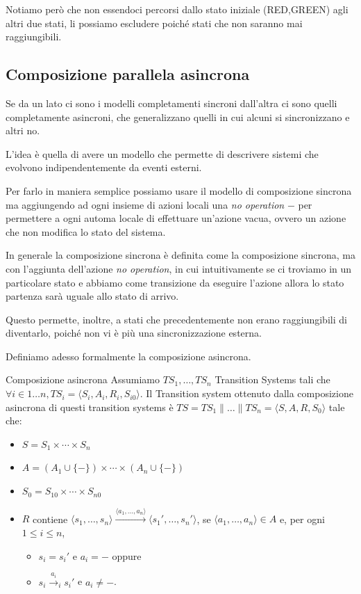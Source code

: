 \begin{note}{}
  Notiamo però che non essendoci percorsi dallo stato iniziale (RED,GREEN) agli altri due stati, li possiamo escludere poiché stati che non saranno mai raggiungibili.
\end{note}

\subsection{Composizione parallela asincrona}

Se da un lato ci sono i modelli completamenti sincroni dall'altra ci sono quelli completamente asincroni, che generalizzano quelli in cui alcuni si sincronizzano e altri no.

L'idea è quella di avere un modello che permette di descrivere sistemi che evolvono indipendentemente da eventi esterni.

Per farlo in maniera semplice possiamo usare il modello di composizione sincrona ma aggiungendo ad ogni insieme di azioni locali una \textit{no operation} \(-\) per permettere a ogni automa locale di effettuare un'azione vacua, ovvero un azione che non modifica lo stato del sistema.


In generale la composizione sincrona è definita come la composizione sincrona, ma con l'aggiunta dell'azione \textit{no operation}, in cui intuitivamente se ci troviamo in un particolare stato e abbiamo come  transizione da eseguire l'azione \q{\(-\)} allora lo stato partenza sarà uguale allo stato di arrivo.

Questo permette, inoltre, a stati che precedentemente non erano raggiungibili di diventarlo, poiché non vi è più una sincronizzazione esterna.

Definiamo adesso formalmente la composizione asincrona.

\begin{definition}{Composizione asincrona}
  Assumiamo \(TS_1,\ldots,TS_n\) Transition Systems tali che \(\forall i \in 1\ldots n, TS_i = \langle S_i,A_i,R_i,S_{i0}\rangle \). Il Transition system ottenuto dalla composizione asincrona di questi transition systems è \( TS = TS_1 \| \ldots \| TS_n = \langle S,A,R,S_0\rangle \) tale che:
  \begin{itemize}
    \item \( S = S_1 \times \cdots \times S_n \)
    \item \( A = (A_1 \cup \{-\}) \times \cdots \times (A_n \cup \{-\}) \)
    \item \( S_0 = S_{10} \times \cdots \times S_{n0} \)
    \item \( R \) contiene \( \langle s_1,\ldots,s_n \rangle \xrightarrow{\langle a_1,\ldots,a_n \rangle} \langle s_1',\ldots,s_n' \rangle \), se \( \langle a_1,\ldots,a_n \rangle \in A \) e, per ogni \( 1 \leq i \leq n \),
          \begin{itemize}
            \item \( s_i = s_i' \) e \( a_i = - \) oppure
            \item \( s_i \xrightarrow{a_i}_i s_i' \) e \( a_i \neq - \).
          \end{itemize}
  \end{itemize}
\end{definition}

